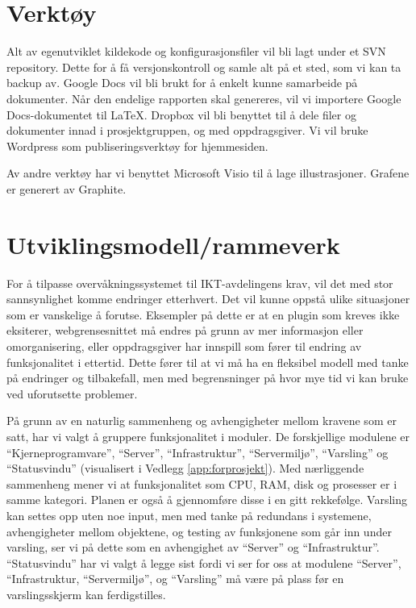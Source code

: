 \section{Verktøy}
Alt av egenutviklet kildekode og konfigurasjonsfiler vil bli lagt under et SVN repository. Dette for å få versjonskontroll og samle alt på et sted, som vi kan ta backup av. Google Docs vil bli brukt for å enkelt kunne samarbeide på dokumenter. Når den endelige rapporten skal genereres, vil vi importere Google Docs-dokumentet til LaTeX. Dropbox vil bli benyttet til å dele filer og dokumenter innad i prosjektgruppen, og med oppdragsgiver. Vi vil bruke Wordpress som publiseringsverktøy for hjemmesiden.

Av andre verktøy har vi benyttet Microsoft Visio til å lage illustrasjoner. Grafene er generert av Graphite.

\section{Utviklingsmodell/rammeverk}
For å tilpasse overvåkningssystemet til IKT-avdelingens krav, vil det med stor sannsynlighet komme endringer etterhvert. Det vil kunne oppstå ulike situasjoner som er vanskelige å forutse. Eksempler på dette er at en plugin som kreves ikke eksiterer, webgrensesnittet må endres på grunn av mer informasjon eller omorganisering, eller oppdragsgiver har innspill som fører til endring av funksjonalitet i ettertid. Dette fører til at vi må ha en fleksibel modell med tanke på endringer og tilbakefall, men med begrensninger på hvor mye tid vi kan bruke ved uforutsette problemer.

På grunn av en naturlig sammenheng og avhengigheter mellom kravene som er satt, har vi valgt å gruppere funksjonalitet i moduler. De forskjellige modulene er “Kjerneprogramvare”, “Server”, “Infrastruktur”, “Servermiljø”, “Varsling” og “Statusvindu” (visualisert i Vedlegg \ref{app:forprosjekt}). Med nærliggende sammenheng mener vi at funksjonalitet som CPU, RAM, disk og prosesser er i samme kategori. Planen er også å gjennomføre disse i en gitt rekkefølge. Varsling kan settes opp uten noe input, men med tanke på redundans i systemene, avhengigheter mellom objektene, og testing av funksjonene som går inn under varsling, ser vi på dette som en avhengighet av “Server” og “Infrastruktur”. “Statusvindu” har vi valgt å legge sist fordi vi ser for oss at modulene “Server”, “Infrastruktur, “Servermiljø”, og “Varsling” må være på plass før en varslingsskjerm kan ferdigstilles.


